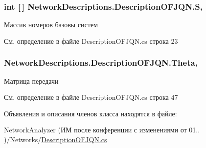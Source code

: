 \subsubsection[{\texorpdfstring{S}{S}}]{\setlength{\rightskip}{0pt plus 5cm}int \mbox{[}$\,$\mbox{]} Network\+Descriptions.\+Description\+O\+F\+J\+Q\+N.\+S\hspace{0.3cm}{\ttfamily [get]}, {\ttfamily [set]}}\hypertarget{class_network_descriptions_1_1_description_o_f_j_q_n_a31744a17bac05c3e10a7e958ad3fdb0c}{}\label{class_network_descriptions_1_1_description_o_f_j_q_n_a31744a17bac05c3e10a7e958ad3fdb0c}


Массив номеров базовы систем 



См. определение в файле Description\+O\+F\+J\+Q\+N.\+cs строка 23

\subsubsection[{\texorpdfstring{Theta}{Theta}}]{ Network\+Descriptions.\+Description\+O\+F\+J\+Q\+N.\+Theta\hspace{0.3cm}{\ttfamily [get]}, {\ttfamily [set]}}\hypertarget{class_network_descriptions_1_1_description_o_f_j_q_n_af8d4bf8f19a4db2daef14d0dafd77a00}{}\label{class_network_descriptions_1_1_description_o_f_j_q_n_af8d4bf8f19a4db2daef14d0dafd77a00}


Матрица передачи 



См. определение в файле Description\+O\+F\+J\+Q\+N.\+cs строка 47



Объявления и описания членов класса находятся в файле\+:\begin{DoxyCompactItemize}
\item 
Network\+Analyzer (ИМ после конференции  с изменениями от 01.. )/\+Networks/\hyperlink{_description_o_f_j_q_n_8cs}{Description\+O\+F\+J\+Q\+N.\+cs}\end{DoxyCompactItemize}

